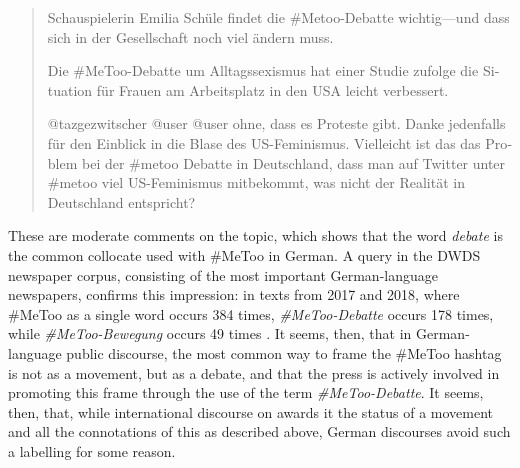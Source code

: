 \documentclass[output=paper,english,spanish,german,english]{langsci/langscibook}
\begin{document}
\begin{quote}\sffamily
  \foreignlanguage{german}{Schauspielerin Emilia Schüle findet die \#Metoo-Debatte wichtig---und dass sich in der Gesellschaft noch viel ändern muss.}

  \foreignlanguage{german}{Die \#MeToo-Debatte um Alltagssexismus hat einer Studie zufolge die Situation für Frauen am Arbeitsplatz in den USA leicht verbessert.}

  \foreignlanguage{german}{@tazgezwitscher @user @user ohne, dass es Proteste gibt. Danke jedenfalls für den Einblick in die Blase des US-Feminismus. Vielleicht ist das das Problem bei der \#metoo Debatte in Deutschland, dass man auf Twitter unter \#metoo viel US-Feminismus mitbekommt, was nicht der Realität in Deutschland entspricht?}
\end{quote}

\noindent These are moderate comments on the topic, which shows that the word \textit{debate} is the common collocate used with \#MeToo in German. A query in the DWDS newspaper corpus, consisting of the most important German-language newspapers, confirms this impression: in texts from 2017 and 2018, where \#MeToo as a single word occurs 384 times, \textit{\#MeToo-Debatte} occurs 178 times, while \textit{\#MeToo-Bewegung} occurs 49 times \parencite{dwds}. It seems, then, that in German-language public discourse, the most common way to frame the \#MeToo hashtag is not as a movement, but as a debate, and that the press is actively involved in promoting this frame through the use of the term \textit{\#MeToo-Debatte}. It seems, then, that, while international discourse on \mt awards it the status of a movement and all the connotations of this as described above, German discourses avoid such a labelling for some reason.
\end{document}
